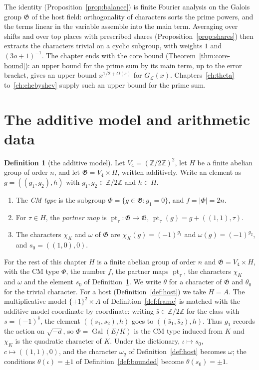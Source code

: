 \documentclass[11pt]{amsbook}
\theoremstyle{plain}
\theoremstyle{definition}
\newtheorem{definition}[theorem]{Definition}
\theoremstyle{remark}
\numberwithin{equation}{section}
\numberwithin{figure}{chapter}
\numberwithin{table}{chapter}
\newcommand{\Z}{\mathbb{Z}}
\newcommand{\eps}{\varepsilon}
\newcommand{\lev}{\mathscr{L}}
\newcommand{\Gal}{\operatorname{Gal}}
\newcommand{\GG}{\mathfrak{G}}
\newcommand{\pt}{\operatorname{pt}}
\begin{document}
The identity (Proposition~\ref{prop:balance}) is finite Fourier
analysis on the Galois group $\GG$ of the host field: orthogonality of
characters sorts the prime powers, and the terms linear in the
variable assemble into the main term. Averaging over shifts and over
top places with prescribed shares (Proposition~\ref{prop:shares})
then extracts the characters trivial on a cyclic subgroup, with
weights $1$ and $(3o+1)^{-1}$. The chapter ends with the core bound
(Theorem~\ref{thm:core-bound}): an upper bound for the prime sum by
its main term, up to the error bracket, gives an upper bound
$x^{1/2+O(\eps)}$ for $G_\lev(x)$. Chapters~\ref{ch:theta}
to~\ref{ch:chebyshev} supply such an upper bound for the prime sum.

\section{The additive model and arithmetic data}

\begin{definition}[the additive model]\label{def:additive}
Let $V_4=(\Z/2\Z)^2$, let $H$ be a finite abelian group of order $n$,
and let $\GG=V_4\times H$, written additively. Write an element as
$g=((g_1,g_2),h)$ with $g_1,g_2\in\Z/2\Z$ and $h\in H$.
\begin{enumerate}[label=(\arabic*)]
\item The \emph{CM type} is the subgroup $\Phi=\{g\in\GG:g_1=0\}$, and
$f=|\Phi|=2n$.
\item For $\tau\in H$, the \emph{partner map} is
$\pt_\tau\colon\GG\to\GG$, $\pt_\tau(g)=g+((1,1),\tau)$.
\item The characters $\chi_K$ and $\omega$ of $\GG$ are
$\chi_K(g)=(-1)^{g_1}$ and $\omega(g)=(-1)^{g_2}$, and
$s_0=((1,0),0)$.
\end{enumerate}
\end{definition}

\noindent For the rest of this chapter $H$ is a finite abelian group
of order $n$ and $\GG=V_4\times H$, with the CM type $\Phi$, the
number $f$, the partner maps $\pt_\tau$, the characters $\chi_K$ and
$\omega$ and the element $s_0$ of Definition~\ref{def:additive}.
We write $\theta$ for a character of $\GG$ and $\theta_0$
for the trivial character. For a host (Definition~\ref{def:host}) we
take $H=A$. The multiplicative model $\{\pm1\}^2\times A$ of
Definition~\ref{def:frame} is matched with the additive model
coordinate by coordinate: writing $\bar s\in\Z/2\Z$ for the
class with $s=(-1)^{\bar s}$, the element $((s_1,s_2),h)$ goes to
$((\bar s_1,\bar s_2),h)$. Thus $g_1$ records the action on
$\sqrt{-d}$, so
$\Phi=\Gal(E/K)$ is the CM type induced from $K$ and $\chi_K$ is the
quadratic character of $K$. Under the dictionary,
$\iota\mapsto s_0$, $c\mapsto((1,1),0)$, and the character $\omega_q$
of Definition~\ref{def:host} becomes $\omega$; the conditions
$\theta(\iota)=\pm1$ of Definition~\ref{def:bounded} become
$\theta(s_0)=\pm1$.
\end{document}
